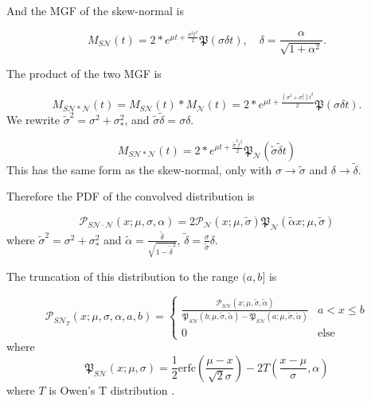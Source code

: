 \documentclass[twocolumn]{aastex631}
\newcommand{\mfk}[1]{\mathfrak{#1}}
\newcommand{\mcal}[1]{\mathcal{#1}}
\newcommand{\Exp}[1]{e^{#1}}
\newcommand{\pdf}{\mcal{P}}
\newcommand{\cdf}{\mfk{P}}
\begin{document}
        And the MGF of the skew-normal is

        \begin{equation} \label{eq:mgf_skewnormal}
            M_{S\mcal{N}}(t) = 2 * \Exp{\mu t + \frac{\sigma^2 t^2}{2}} \cdf(\sigma \delta t), \quad \delta = \frac{\alpha}{\sqrt{1 + \alpha^2}}.
        \end{equation}

        The product of the two MGF is

        \begin{equation}
            M_{S\mcal{N}*\mcal{N}}(t) = M_{S\mcal{N}}(t) * M_{\mcal{N}}(t) = 2 * \Exp{\mu t + \frac{(\sigma^2 + \sigma_*^2) t^2}{2}} \cdf(\sigma \delta t).
        \end{equation}
        We rewrite $\tilde\sigma^2 = \sigma^2 + \sigma_*^2$, and $\tilde{\sigma} \tilde{\delta} = \sigma \delta$.

        \begin{equation}
            M_{S\mcal{N}*\mcal{N}}(t) = 2 * \Exp{\mu t + \frac{\tilde{\sigma}^2 t^2}{2}} \cdf_{\mcal{N}}(\tilde{\sigma} \tilde{\delta} t)
        \end{equation}
        This has the same form as the skew-normal, only with $\sigma \rightarrow \tilde\sigma$ and $\delta \rightarrow \tilde\delta$.

        Therefore the PDF of the convolved distribution is 

        \begin{equation}
            \pdf_{S\mcal{N}\cdot\mcal{N}}(x;\mu,\sigma,\alpha) = 2\pdf_{\mcal{N}}(x;\mu,\tilde{\sigma})\cdf_{\mcal{N}}(\tilde{\alpha} x;\mu,\tilde{\sigma})
        \end{equation}
        where $\tilde\sigma^2 = \sigma^2 + \sigma_*^2$ and $\tilde{\alpha} = \frac{\tilde{\delta}}{\sqrt{1-\tilde{\delta}^2}}$, $\tilde{\delta} = \frac{\sigma}{\tilde{\sigma}}\delta$.

        The truncation of this distribution to the range $(a, b]$ is

       \begin{equation}
            \pdf_{S\mcal{N}_T}(x; \mu, \sigma, \alpha, a, b)
                = \begin{cases}
                    \frac{\pdf_{S\mcal{N}}(x; \mu, \tilde\sigma, \tilde\alpha)}{\cdf_{S\mcal{N}}(b; \mu, \tilde\sigma, \tilde\alpha) - \cdf_{S\mcal{N}}(a; \mu, \tilde\sigma, \tilde\alpha)} & a < x \leq b \\
                    0 & \text{else}
                \end{cases}
        \end{equation}
        where
        \begin{equation}
            \cdf_{S\mcal{N}}(x; \mu, \sigma) = \frac{1}{2} \text{erfc}\left(\frac{\mu -x}{\sqrt{2} \sigma }\right)-2 T\left(\frac{x-\mu }{\sigma },\alpha \right)
        \end{equation}
        where $T$ is Owen's T distribution \citep{Owen_1956}.
\end{document}
